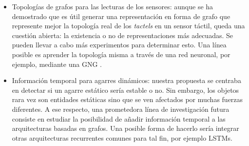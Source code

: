 \begin{itemize}
    \item Topologías de grafos para las lecturas de los sensores: aunque se ha demostrado que es útil generar una representación en forma de grafo que represente mejor la topología real de los \emph{tactels} en un sensor táctil, queda una cuestión abierta: la existencia o no de representaciones más adecuadas. Se pueden llevar a cabo más experimentos para determinar esto. Una línea posible es aprender la topología misma a través de una red neuronal, por ejemplo, mediante una \ac{GNG} \cite{Fritzke1999}.
    \item Información temporal para agarres dinámicos: nuestra propuesta se centraba en detectar si un agarre estático sería estable o no. Sin embargo, los objetos rara vez son entidades estáticas sino que se ven afectados por muchas fuerzas diferentes. A ese respecto, una prometedora línea de investigación futura consiste en estudiar la posibilidad de añadir información temporal a las arquitecturas basadas en grafos. Una posible forma de hacerlo sería integrar otras arquitecturas recurrentes comunes para tal fin, por ejemplo \aclp{LSTM}.
\end{itemize}